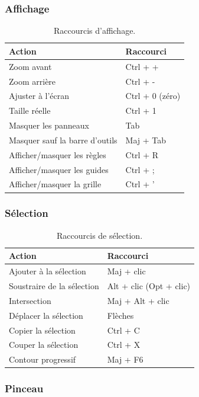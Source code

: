 \subsubsection{Affichage}

\begin{table}[h!]
\centering
\begin{tabular}{@{}ll@{}}
\toprule
\textbf{Action} & \textbf{Raccourci} \\
\midrule
Zoom avant & Ctrl + + \\
Zoom arrière & Ctrl + - \\
Ajuster à l'écran & Ctrl + 0 (zéro) \\
Taille réelle & Ctrl + 1 \\
Masquer les panneaux & Tab \\
Masquer sauf la barre d'outils & Maj + Tab \\
Afficher/masquer les règles & Ctrl + R \\
Afficher/masquer les guides & Ctrl + ; \\
Afficher/masquer la grille & Ctrl + ' \\
\bottomrule
\end{tabular}
\caption{Raccourcis d'affichage.}
\end{table}

\subsubsection{Sélection}

\begin{table}[h!]
\centering
\begin{tabular}{@{}ll@{}}
\toprule
\textbf{Action} & \textbf{Raccourci} \\
\midrule
Ajouter à la sélection & Maj + clic \\
Soustraire de la sélection & Alt + clic (Opt + clic) \\
Intersection & Maj + Alt + clic \\
Déplacer la sélection & Flèches \\
Copier la sélection & Ctrl + C \\
Couper la sélection & Ctrl + X \\
Contour progressif & Maj + F6 \\
\bottomrule
\end{tabular}
\caption{Raccourcis de sélection.}
\end{table}

\subsubsection{Pinceau}

